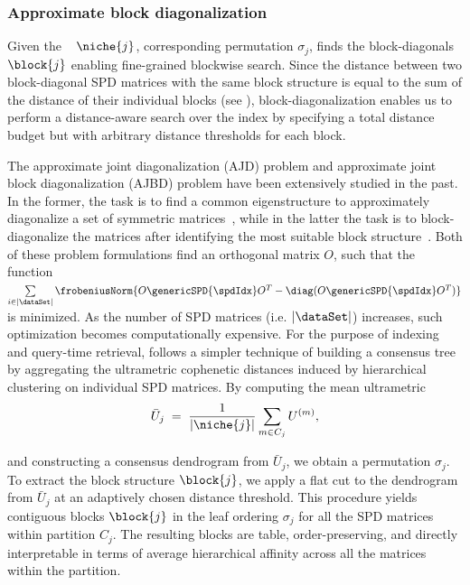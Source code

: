 \documentclass[pdflatex,sn-mathphys-num]{sn-jnl}%
\theoremstyle{thmstyleone}%
\theoremstyle{thmstyletwo}%
\theoremstyle{thmstylethree}%
\begin{document}
\subsubsection{Approximate block diagonalization} 
Given the \spdniche~ $\niche{j}$, corresponding permutation $\sigma_j$, \OurMethod finds the block-diagonals $\block{j}$ enabling fine-grained blockwise search. Since the \logEuclid distance between two block-diagonal SPD matrices with the same block structure is equal to the sum of the \logEuclid distance of their individual blocks (see ), block-diagonalization enables us to perform a distance-aware search over the index by specifying a total \logEuclid distance budget but with arbitrary distance thresholds for each block. 

The approximate joint diagonalization (AJD) problem and approximate joint block diagonalization (AJBD) problem have been extensively studied in the past. In the former, the task is to find a common eigenstructure to approximately diagonalize a set of symmetric matrices~\cite{pham2001joint, he2024randomized, tichavsky2008fast}, while in the latter the task is to block-diagonalize the matrices after identifying the most suitable block structure~\cite{cai2021identification,theis2006towards}. Both of these problem formulations find an orthogonal matrix $O$, such that the function $\sum\limits_{i \in |\dataSet|} \frobeniusNorm{O \genericSPD{\spdIdx} O^T - \diag(O \genericSPD{\spdIdx} O^T)}$ is minimized. As the number of SPD matrices (i.e. $|\dataSet|$) increases, such optimization becomes computationally expensive. For the purpose of indexing and query-time retrieval, \OurMethod follows a simpler technique of building a consensus tree by aggregating the ultrametric cophenetic distances induced by hierarchical clustering on individual SPD matrices. By computing the mean ultrametric
\[
\bar U_j \;=\; \frac{1}{|\niche{j}|} \sum_{m \in C_j} U^{(m)},
\]

and constructing a consensus dendrogram from $\bar U_j$, we obtain a permutation $\sigma_j$. To extract the block structure $\block{j}$, we apply a flat cut to the dendrogram from $\bar U_j$ at an adaptively chosen distance threshold. This procedure yields contiguous blocks $\block{j}$ in the leaf ordering $\sigma_j$ for all the SPD matrices within partition $C_j$. The resulting blocks are table, order-preserving, and directly interpretable in terms of average hierarchical affinity across all the matrices within the partition.
\end{document}
